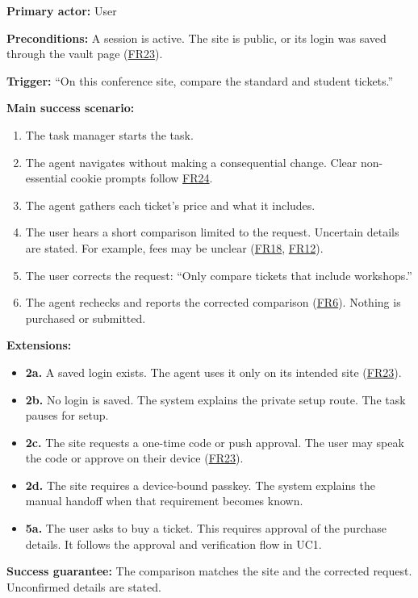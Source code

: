 \documentclass{scrreprt}
\theoremstyle{definition}
\newcommand{\reqlink}[1]{\hyperlink{req:#1}{#1}}
\begin{document}
\textbf{Primary actor:} User

\textbf{Preconditions:} A session is active. The site is public, or its login was saved through the vault page (\reqlink{FR23}).

\textbf{Trigger:} ``On this conference site, compare the standard and student tickets.''

\textbf{Main success scenario:}
\begin{enumerate}
    \item The task manager starts the task.
    \item The agent navigates without making a consequential change. Clear non-essential cookie prompts follow \reqlink{FR24}.
    \item The agent gathers each ticket's price and what it includes.
    \item The user hears a short comparison limited to the request. Uncertain details are stated. For example, fees may be unclear (\reqlink{FR18}, \reqlink{FR12}).
    \item The user corrects the request: ``Only compare tickets that include workshops.''
    \item The agent rechecks and reports the corrected comparison (\reqlink{FR6}). Nothing is purchased or submitted.
\end{enumerate}

\textbf{Extensions:}
\begin{itemize}
    \item \textbf{2a.} A saved login exists. The agent uses it only on its intended site (\reqlink{FR23}).
    \item \textbf{2b.} No login is saved. The system explains the private setup route. The task pauses for setup.
    \item \textbf{2c.} The site requests a one-time code or push approval. The user may speak the code or approve on their device (\reqlink{FR23}).
    \item \textbf{2d.} The site requires a device-bound passkey. The system explains the manual handoff when that requirement becomes known.
    \item \textbf{5a.} The user asks to buy a ticket. This requires approval of the purchase details. It follows the approval and verification flow in UC1.
\end{itemize}

\textbf{Success guarantee:} The comparison matches the site and the corrected request. Unconfirmed details are stated.
\end{document}
